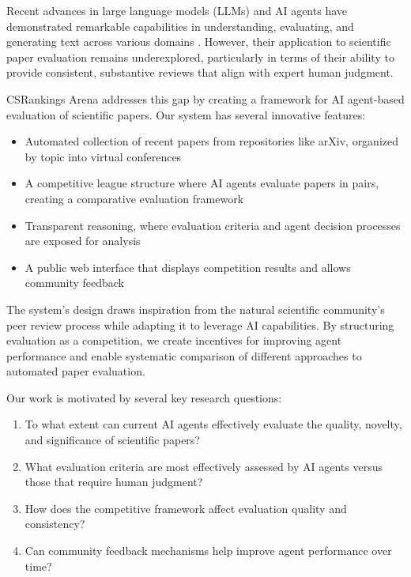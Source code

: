 \documentclass[conference]{IEEEtran}
\begin{document}
Recent advances in large language models (LLMs) and AI agents have demonstrated remarkable capabilities in understanding, evaluating, and generating text across various domains \cite{brown2020language, chowdhery2022palm}. However, their application to scientific paper evaluation remains underexplored, particularly in terms of their ability to provide consistent, substantive reviews that align with expert human judgment.

CSRankings Arena addresses this gap by creating a framework for AI agent-based evaluation of scientific papers. Our system has several innovative features:

\begin{itemize}
    \item Automated collection of recent papers from repositories like arXiv, organized by topic into virtual conferences
    \item A competitive league structure where AI agents evaluate papers in pairs, creating a comparative evaluation framework
    \item Transparent reasoning, where evaluation criteria and agent decision processes are exposed for analysis
    \item A public web interface that displays competition results and allows community feedback
\end{itemize}

The system's design draws inspiration from the natural scientific community's peer review process while adapting it to leverage AI capabilities. By structuring evaluation as a competition, we create incentives for improving agent performance and enable systematic comparison of different approaches to automated paper evaluation.

Our work is motivated by several key research questions:

\begin{enumerate}
    \item To what extent can current AI agents effectively evaluate the quality, novelty, and significance of scientific papers?
    \item What evaluation criteria are most effectively assessed by AI agents versus those that require human judgment?
    \item How does the competitive framework affect evaluation quality and consistency?
    \item Can community feedback mechanisms help improve agent performance over time?
\end{enumerate}
\end{document}
